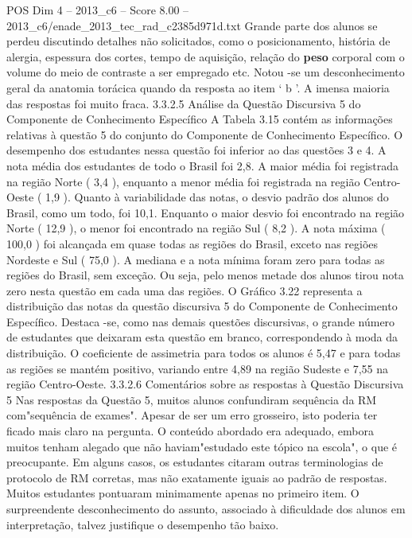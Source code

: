 \begin{textsample}{POS Dim 4 – 2013\_c6 – Score 8.00 – 2013\_c6/enade\_2013\_tec\_rad\_c2385d971d.txt}
Grande parte dos alunos se perdeu discutindo detalhes não solicitados, como o posicionamento, história de alergia, espessura dos cortes, tempo de aquisição, relação do \textbf{peso} corporal com o volume do meio de contraste a ser empregado etc.
Notou -se um desconhecimento geral da anatomia torácica quando da resposta ao item ‘ b ’.
A imensa maioria das respostas foi muito fraca. 3.3.2.5 Análise da Questão Discursiva 5 do Componente de Conhecimento Específico A Tabela 3.15 contém as informações relativas à questão 5 do conjunto do Componente de Conhecimento Específico.
O desempenho dos estudantes nessa questão foi inferior ao das questões 3 e 4.
A nota média dos estudantes de todo o Brasil foi 2,8.
A maior média foi registrada na região Norte ( 3,4 ), enquanto a menor média foi registrada na região Centro-Oeste ( 1,9 ).
Quanto à variabilidade das notas, o desvio padrão dos alunos do Brasil, como um todo, foi 10,1.
Enquanto o maior desvio foi encontrado na região Norte ( 12,9 ), o menor foi encontrado na região Sul ( 8,2 ).
A nota máxima ( 100,0 ) foi alcançada em quase todas as regiões do Brasil, exceto nas regiões Nordeste e Sul ( 75,0 ).
A mediana e a nota mínima foram zero para todas as regiões do Brasil, sem exceção.
Ou seja, pelo menos metade dos alunos tirou nota zero nesta questão em cada uma das regiões.
O Gráfico 3.22 representa a distribuição das notas da questão discursiva 5 do Componente de Conhecimento Específico.
Destaca -se, como nas demais questões discursivas, o grande número de estudantes que deixaram esta questão em branco, correspondendo à moda da distribuição.
O coeficiente de assimetria para todos os alunos é 5,47 e para todas as regiões se mantém positivo, variando entre 4,89 na região Sudeste e 7,55 na região Centro-Oeste. 3.3.2.6 Comentários sobre as respostas à Questão Discursiva 5 Nas respostas da Questão 5, muitos alunos confundiram sequência da RM com"sequência de exames".
Apesar de ser um erro grosseiro, isto poderia ter ficado mais claro na pergunta.
O conteúdo abordado era adequado, embora muitos tenham alegado que não haviam"estudado este tópico na escola", o que é preocupante.
Em alguns casos, os estudantes citaram outras terminologias de protocolo de RM corretas, mas não exatamente iguais ao padrão de respostas.
Muitos estudantes pontuaram minimamente apenas no primeiro item.
O surpreendente desconhecimento do assunto, associado à dificuldade dos alunos em interpretação, talvez justifique o desempenho tão baixo.

\end{textsample}
